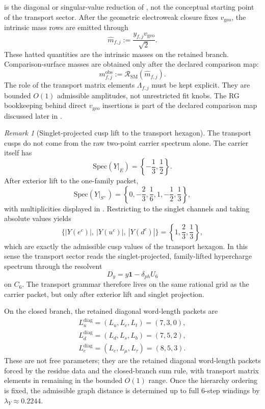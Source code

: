\documentclass[11pt,a4paper]{article}
\theoremstyle{definition}
\theoremstyle{remark}
\newtheorem*{remark}{Remark}
\newcommand{\SM}{\mathrm{SM}}
\newcommand{\lambdaY}{\lambda_Y}
\newcommand{\vgeo}{v_{\mathrm{geo}}}
\begin{document}
 is the diagonal or singular-value reduction of
, not the conceptual starting point of the transport sector.
After the geometric electroweak closure fixes $\vgeo$, the intrinsic mass rows are emitted through
\begin{equation}
\label{eq:mass-bridge}
\hat m_{f,j}:=\frac{y_{f,j}\vgeo}{\sqrt2}.
\end{equation}
These hatted quantities are the intrinsic masses on the retained branch. Comparison-surface masses
are obtained only after the declared comparison map:
\[
m_{f,j}^{\mathrm{obs}}:=\mathcal R_{\SM}(\hat m_{f,j}).
\]
The role of the transport matrix elements $\Lambda_{f,j}$ must be kept explicit. They are bounded $O(1)$ admissible amplitudes, not unrestricted fit knobs. The RG bookkeeping behind direct $\vgeo$ insertions is part of the declared comparison map discussed later in .

\begin{remark}[Singlet-projected cusp lift to the transport hexagon]
The transport cusps do not come from the raw two-point carrier spectrum alone. The carrier itself has
\[
\mathrm{Spec}(Y|_E)=\left\{-\frac13,\frac12\right\}.
\]
After exterior lift to the one-family packet,
\[
\mathrm{Spec}(Y|_{S^+})
=
\left\{0,-\frac23,\frac16,1,-\frac12,\frac13\right\},
\]
with multiplicities displayed in . Restricting to the singlet channels and taking absolute values yields
\[
\{|Y(e^c)|,\ |Y(u^c)|,\ |Y(d^c)|\}
=
\left\{1,\frac23,\frac13\right\},
\]
which are exactly the admissible cusp values of the transport hexagon. In this sense the transport sector reads the singlet-projected, family-lifted hypercharge spectrum through the resolvent
\[
D_y=y\mathbf 1-\delta_{ph}U_6
\]
on $C_6$. The transport grammar therefore lives on the same rational grid as the carrier packet, but only after exterior lift and singlet projection.
\end{remark}

On the closed branch, the retained diagonal word-length packets are
\begin{equation}
\label{eq:minimal-word-lengths}
\begin{gathered}
L_u^{\mathrm{diag}}=(L_u,L_c,L_t)=(7,3,0),\\
L_d^{\mathrm{diag}}=(L_d,L_s,L_b)=(7,5,2),\\
L_e^{\mathrm{diag}}=(L_e,L_\mu,L_\tau)=(8,5,3).
\end{gathered}
\end{equation}
These are not free parameters; they are the retained diagonal word-length packets forced by the
residue data and the closed-branch sum rule, with transport matrix elements in
 remaining in the bounded $O(1)$ range. Once the hierarchy ordering is
fixed, the admissible graph distance is determined up to full $6$-step windings by
$\lambdaY\approx\num{0.2244}$.
\end{document}
